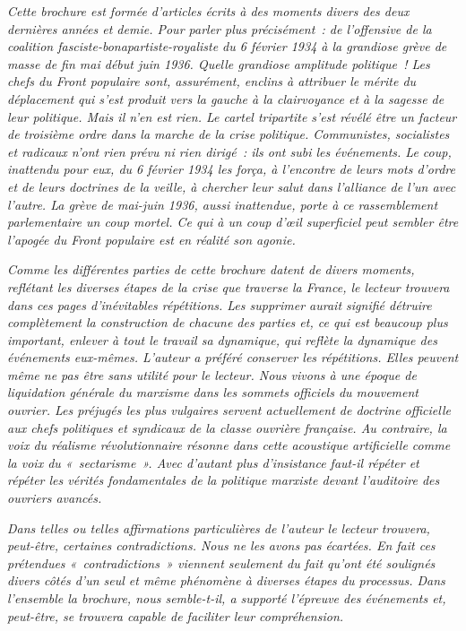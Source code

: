 \documentclass[french,twoside]{book} %
\begin{document}
\noindent  \emph{Cette brochure est formée d’articles écrits à des moments divers des deux dernières années et demie. Pour parler plus précisément : de l’offensive de la coalition fasciste-bonapartiste-royaliste du 6 février 1934 à la grandiose grève de masse de fin mai début juin 1936. Quelle grandiose amplitude politique ! Les chefs du Front populaire sont, assurément, enclins à attribuer le mérite du déplacement qui s’est produit vers la gauche à la clairvoyance et à la sagesse de leur politique. Mais il n’en est rien. Le cartel tripartite s’est révélé être un facteur de troisième ordre dans la marche de la crise politique. Communistes, socialistes et radicaux n’ont rien prévu ni rien dirigé : ils ont subi les événements. Le coup, inattendu pour eux, du 6 février 1934 les força, à l’encontre de leurs mots d’ordre et de leurs doctrines de la veille, à chercher leur salut dans l’alliance de l’un avec l’autre. La grève de mai-juin 1936, aussi inattendue, porte à ce rassemblement parlementaire un coup mortel. Ce qui à un coup d’œil superficiel peut sembler être l’apogée du Front populaire est en réalité son agonie.} \par
 \emph{Comme les différentes parties de cette brochure datent de divers moments, reflétant les diverses étapes de la crise que traverse la France,  le lecteur trouvera dans ces pages d’inévitables répétitions. Les supprimer aurait signifié détruire complètement la construction de chacune des parties et, ce qui est beaucoup plus important, enlever à tout le travail sa dynamique, qui reflète la dynamique des événements eux-mêmes. L’auteur a préféré conserver les répétitions. Elles peuvent même ne pas être sans utilité pour le lecteur. Nous vivons à une époque de liquidation générale du marxisme dans les sommets officiels du mouvement ouvrier. Les préjugés les plus vulgaires servent actuellement de doctrine officielle aux chefs politiques et syndicaux de la classe ouvrière française. Au contraire, la voix du réalisme révolutionnaire résonne dans cette acoustique artificielle comme la voix du « sectarisme ». Avec d’autant plus d’insistance faut-il \emph{répéter} et \emph{répéter} les vérités fondamentales de la politique marxiste devant l’auditoire des ouvriers avancés.} \par
 \emph{Dans telles ou telles affirmations particulières de l’auteur le lecteur trouvera, peut-être, certaines contradictions. Nous ne les avons pas écartées. En fait ces prétendues « contradictions » viennent seulement du fait qu’ont été soulignés divers côtés d’un seul et même phénomène à diverses étapes du processus. Dans l’ensemble la brochure, nous semble-t-il, a supporté l’épreuve des événements et, peut-être, se trouvera capable de faciliter leur compréhension.} \par
\end{document}
